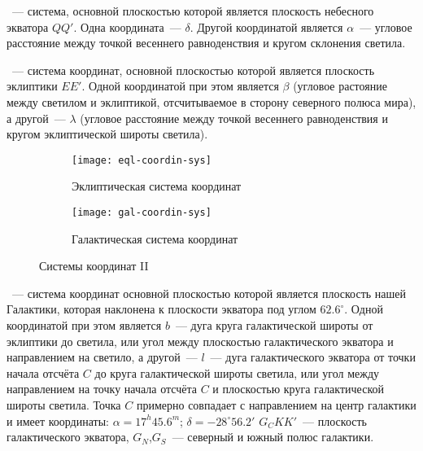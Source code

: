 ~--- система, основной плоскостью которой является плоскость небесного экватора $QQ'$. Одна координата~---  $\delta$. Другой координатой является  $\alpha$~--- угловое расстояние между точкой весеннего равноденствия и кругом склонения светила.


~--- система координат, основной плоскостью которой является плоскость эклиптики $EE'$. Одной координатой при этом является  $\beta$ (угловое растояние между светилом и эклиптикой, отсчитываемое в сторону северного полюса мира), а другой~---  $\lambda$ (угловое расстояние между точкой весеннего равноденствия и кругом эклиптической широты светила).

\begin{figure}[!h]

\centering
	\begin{subfigure}{0.49\textwidth}
		\texttt{[image: eql-coordin-sys]}
		\caption{Эклиптическая система координат}
	 \end{subfigure}
	 \hfill
	\begin{subfigure}{0.49\textwidth}
		\texttt{[image: gal-coordin-sys]}
		\caption{Галактическая система координат}
	 \end{subfigure}
	\caption{Системы координат II}
\end{figure}

~--- система координат основной плоскостью которой является плоскость нашей Галактики, которая наклонена к плоскости экватора под углом $62.6^{\circ}$. Одной координатой при этом является  $b$~--- дуга круга галактической широты от эклиптики до светила, или угол между плоскостью галактического экватора и направлением на светило, а другой~---  $l$~--- дуга галактического экватора от точки начала отсчёта $C$ до круга галактической широты светила, или угол между направлением на точку начала отсчёта $C$ и плоскостью круга галактической широты светила. Точка $C$ примерно совпадает с направлением на центр галактики и имеет координаты: $\alpha=17^h45.6^m$; $\delta=-28^{\circ}56.2'$ $G_CKK'$~--- плоскость галактического экватора, $G_N$,$G_S$~--- северный и южный полюс галактики.